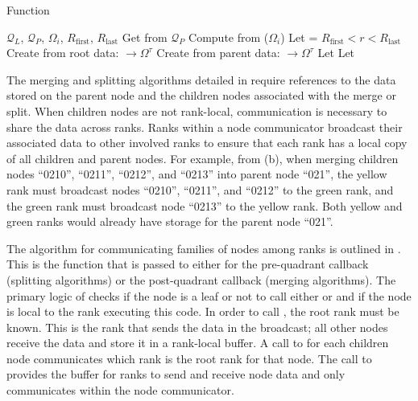 \begin{algorithm}
    \caption{ Function}
    \begin{algorithmic}[0]
        \Require $\mathcal{Q}_{L}$, $\mathcal{Q}_{P}$, $\Omega_i$, $R_{\text{first}}$, $R_{\text{last}}$
        \State Get  from $\mathcal{Q}_{P}$
        \State Compute  from ($\Omega_i$)
        \State Let  = $R_{\text{first}} < r < R_{\text{last}}$
                \State Create  from root data:  $\rightarrow \Omega^{\tau}$
            \Else
                \State Create  from parent data:  $\rightarrow \Omega^{\tau}$
            \EndIf
            \State Let 
        \Else
            \State Let 
        \EndIf
    \end{algorithmic}
    \label{alg:p4est_search_all_callback}
\end{algorithm}

The merging and splitting algorithms detailed in  require references to the data stored on the parent node and the children nodes associated with the merge or split. When children nodes are not rank-local, communication is necessary to share the data across ranks. Ranks within a node communicator broadcast their associated data to other involved ranks to ensure that each rank has a local copy of all children and parent nodes. For example, from (b), when merging children nodes ``0210'', ``0211'', ``0212'', and ``0213'' into parent node ``021'', the yellow rank must broadcast nodes ``0210'', ``0211'', and ``0212'' to the green rank, and the green rank must broadcast node ``0213'' to the yellow rank. Both yellow and green ranks would already have storage for the parent node ``021''.

The algorithm for communicating families of nodes among ranks is outlined in . This is the function that is passed to  either for the pre-quadrant callback (splitting algorithms) or the post-quadrant callback (merging algorithms). The primary logic of  checks if the node is a leaf or not to call either  or  and if the node is local to the rank executing this code. In order to call , the root rank must be known. This is the rank that sends the data in the broadcast; all other nodes receive the data and store it in a rank-local buffer. A call to  for each children node communicates which rank is the root rank for that node. The call to  provides the buffer for ranks to send and receive node data and only communicates within the node communicator.

